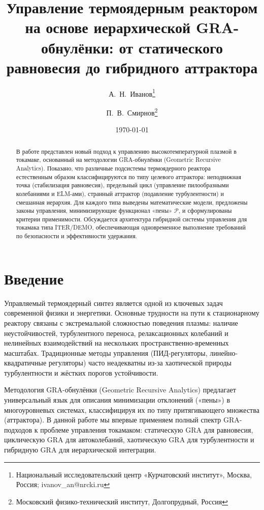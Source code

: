 \documentclass[12pt,a4paper]{article}
\title{\bfseries Управление термоядерным реактором на основе иерархической GRA-обнулёнки: от статического равновесия до гибридного аттрактора}
\author{
    А.~Н.~Иванов\thanks{Национальный исследовательский центр «Курчатовский институт», Москва, Россия; ivanov\_an@nrcki.ru} 
    \and 
    П.~В.~Смирнов\thanks{Московский физико-технический институт, Долгопрудный, Россия}
}
\date{\today}
\numberwithin{equation}{section}
\begin{document}
\maketitle

\begin{abstract}
В работе представлен новый подход к управлению высокотемпературной плазмой в токамаке, основанный на методологии GRA-обнулёнки (Geometric Recursive Analytics). Показано, что различные подсистемы термоядерного реактора естественным образом классифицируются по типу целевого аттрактора: неподвижная точка (стабилизация равновесия), предельный цикл (управление пилообразными колебаниями и ELM-ами), странный аттрактор (подавление турбулентности) и смешанная иерархия. Для каждого типа выведены математические модели, предложены законы управления, минимизирующие функционал «пены» $\mathcal{P}$, и сформулированы критерии применимости. Обсуждается архитектура гибридной системы управления для токамака типа ITER/DEMO, обеспечивающая одновременное выполнение требований по безопасности и эффективности удержания.
\end{abstract}


\section{Введение}
Управляемый термоядерный синтез является одной из ключевых задач современной физики и энергетики. Основные трудности на пути к стационарному реактору связаны с экстремальной сложностью поведения плазмы: наличие неустойчивостей, турбулентного переноса, релаксационных колебаний и нелинейных взаимодействий на нескольких пространственно-временных масштабах. Традиционные методы управления (ПИД-регуляторы, линейно-квадратичные регуляторы) часто неадекватны из-за хаотической природы турбулентности и жёстких порогов устойчивости.

Методология GRA-обнулёнки (Geometric Recursive Analytics) \cite{GRA_original} предлагает универсальный язык для описания минимизации отклонений («пены») в многоуровневых системах, классифицируя их по типу притягивающего множества (аттрактора). В данной работе мы впервые применяем полный спектр GRA-подходов к проблеме управления токамаком: статическую GRA для равновесия, циклическую GRA для автоколебаний, хаотическую GRA для турбулентности и гибридную GRA для иерархической интеграции.
\end{document}
